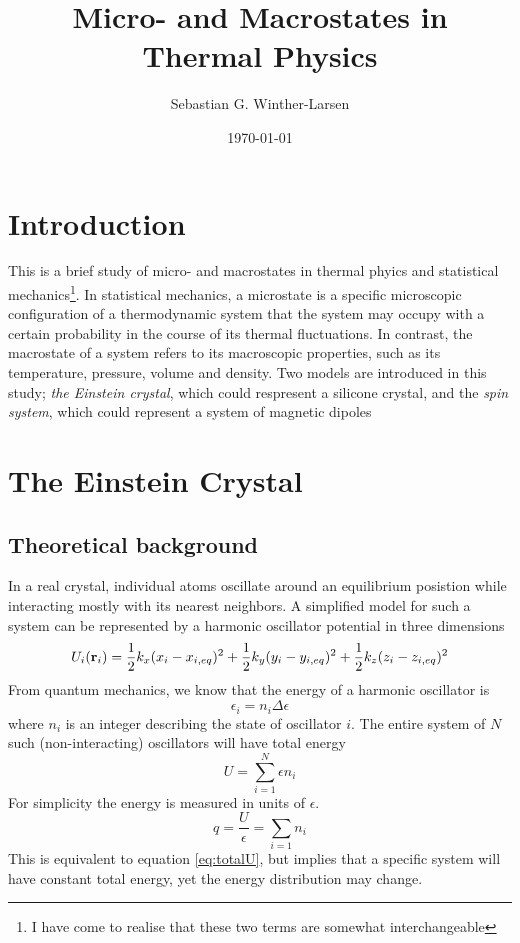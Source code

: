 \documentclass[10pt, a4paper]{amsart}
\title{Micro- and Macrostates in Thermal Physics \\
	\hrulefill\fbox{FYS2160}\hrulefill}
\author[Winther-Larsen]{Sebastian G. Winther-Larsen}
\date{\today}
\begin{document}
\maketitle

\tableofcontents

\section{Introduction}
This is a brief study of micro- and macrostates in thermal phyics and statistical mechanics\footnote{I have come to realise that these two terms are somewhat interchangeable}. In statistical mechanics, a microstate is a specific microscopic configuration of a thermodynamic system that the system may occupy with a certain probability in the course of its thermal fluctuations. In contrast, the macrostate of a system refers to its macroscopic properties, such as its temperature, pressure, volume and density. Two models are introduced in this study; \emph{the Einstein crystal}, which could respresent a silicone crystal, and the \emph{spin system}, which could represent a system of magnetic dipoles

\section{The Einstein Crystal}

\subsection{Theoretical background}
In a real crystal, individual atoms oscillate around an equilibrium posistion while interacting mostly with its nearest neighbors. A simplified model for such a system can be represented by a harmonic oscillator potential in three dimensions
\begin{equation}
U_i(\vb{r}_i)=\frac{1}{2}k_x(x_i-x_{i,eq})^2+\frac{1}{2}k_y(y_i-y_{i,eq})^2+\frac{1}{2}k_z(z_i-z_{i,eq})^2
\end{equation} 
From quantum mechanics, we know that the energy of a harmonic oscillator is
\begin{equation}
\epsilon_i=n_i\Delta \epsilon
\end{equation}
where $n_i$ is an integer describing the state of oscillator $i$. The entire system of $N$ such (non-interacting) oscillators will have total energy
\begin{equation}
\label{eq:totalU}
U=\sum_{i=1}^N \epsilon n_i
\end{equation}
For simplicity the energy is measured in units of $\epsilon$.
\begin{equation}
q = \frac{U}{\epsilon}=\sum_{i=1} n_i
\end{equation}
This is equivalent to equation \ref{eq:totalU}, but implies that a specific system will have constant total energy, yet the energy distribution may change.
\end{document}
